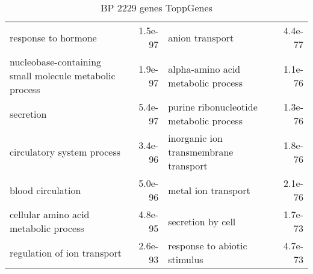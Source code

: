 \documentclass[fleqn,10pt]{SelfArx} %
\begin{document}
\begin{table}[ht]
\begin{tabularx}{\textwidth}{lRlR}
		response to hormone & 1.5e-97 & anion transport & 4.4e-77 \\ 
		nucleobase-containing small molecule metabolic process & 1.9e-97 & alpha-amino acid metabolic process & 1.1e-76 \\ 
		secretion & 5.4e-97 & purine ribonucleotide metabolic process & 1.3e-76 \\ 
		circulatory system process & 3.4e-96 & inorganic ion transmembrane transport & 1.8e-76 \\ 
		blood circulation & 5.0e-96 & metal ion transport & 2.1e-76 \\ 
		cellular amino acid metabolic process & 4.8e-95 & secretion by cell & 1.7e-73 \\ 
		regulation of ion transport & 2.6e-93 & response to abiotic stimulus & 4.7e-73 \\ 
	\end{tabularx}
	\smallskip
	\caption{BP 2229 genes ToppGenes}
	\label{tab:bp2229}
\end{table}
\end{document}
